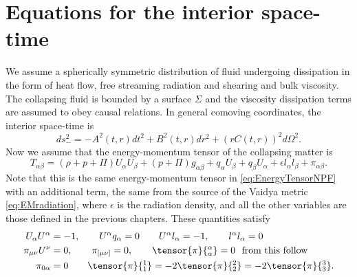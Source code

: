 \section{Equations for the interior space-time}
We assume a spherically symmetric distribution of fluid undergoing dissipation in the form of heat flow, free streaming radiation and shearing and bulk viscosity. The collapsing fluid is bounded by a surface $\Sigma$ and the viscosity dissipation terms are assumed to obey causal relations. In general comoving coordinates, the interior space-time is
\begin{equation}
	\label{eq:MetricInterior}
	ds^{2}_{-} = -A^2 (t, r)dt^2 + B^2 (t,r) dr^2 + (rC(t,r))^2d\Omega^2.
\end{equation}
Now we assume that the energy-momentum tensor of the collapsing matter is \cite{herrera2009dynamics}
\begin{equation}
	\label{eq:EnergyMomeTensorHerrera}
	T_{\alpha\beta} = (\rho + p + \Pi)U_{\alpha}U_{\beta} + (p + \Pi)g_{\alpha\beta} + q_{\alpha} U_{\beta} + q_{\beta} U_{\alpha} + \epsilon l_{\alpha}l_{\beta} + \pi_{\alpha\beta} .
\end{equation}
Note that this is the same energy-momentum tensor in \ref{eq:EnergyTensorNPF} with an additional term, the same from the source of the Vaidya metric \ref{eq:EMradiation}, where $\epsilon$ is the radiation density, and all the other variables are those defined in the previous chapters. These quantities satisfy
\begin{align}\nonumber
	U_{\alpha}U^{\alpha} &= -1, \qquad U^{\alpha}q_{\alpha} = 0 \qquad U^{\alpha}l_{\alpha} = -1 , \qquad l^{\alpha}l_{\alpha} = 0 \\\nonumber
	\pi_{\mu\nu}U^{\nu} &= 0, \qquad \pi_{[\mu\nu]} = 0, \qquad \tensor{\pi}{^{\alpha}_{\alpha}} = 0 \,\,\,\,\text{from this follow}\\\label{eq:Pidef}
	\pi_{0\alpha} &= 0 \qquad \tensor{\pi}{^{1}_1} = -2\tensor{\pi}{^{2}_2} = -2\tensor{\pi}{^{3}_3}.
\end{align}

